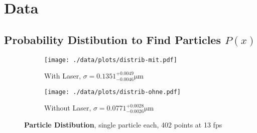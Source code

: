 \chapter{Data}

\section{Probability Distibution to Find Particles $P(x)$}

\begin{figure}
  \centering
  \begin{subfigure}{.45\textwidth}
    \centering
    \texttt{[image: ./data/plots/distrib-mit.pdf]}
    \caption{With Laser, $\sigma = \num{0.1351}^{+0.0049}_{-0.0046}\si{\um}$}
  \end{subfigure}
  \begin{subfigure}{.45\textwidth}
    \centering
    \texttt{[image: ./data/plots/distrib-ohne.pdf]}
    \caption{Without Laser, $\sigma = \num{0.0771}^{+0.0028}_{-0.0026}\si{\um}$}
  \end{subfigure}
  \caption[Particle Distibution]{\textbf{Particle Distibution}, single particle each, 402 points at 13 fps}
\end{figure}
